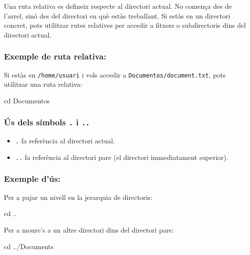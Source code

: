 \documentclass[
  12 pt,
  a4paper,
]{article}
\newenvironment{Shaded}{\begin{snugshade}}{\end{snugshade}}
\newcommand{\BuiltInTok}[1]{#1}
\newcommand{\NormalTok}[1]{#1}
\providecommand{\tightlist}{%
  \setlength{\itemsep}{0pt}\setlength{\parskip}{0pt}}
\begin{document}
Una ruta relativa es defineix respecte al directori actual. No comença
des de l'arrel, sinó des del directori en què estàs treballant. Si estàs
en un directori concret, pots utilitzar rutes relatives per accedir a
fitxers o subdirectoris dins del directori actual.

\subsubsection{Exemple de ruta
relativa:}\label{exemple-de-ruta-relativa}

Si estàs en \texttt{/home/usuari} i vols accedir a
\texttt{Documentos/document.txt}, pots utilitzar una ruta relativa:

\begin{Shaded}
\begin{Highlighting}[]
\BuiltInTok{cd}\NormalTok{ Documentos}
\end{Highlighting}
\end{Shaded}

\subsubsection{\texorpdfstring{Ús dels símbols \texttt{.} i
\texttt{..}}{Ús dels símbols . i ..}}\label{uxfas-dels-suxedmbols-.-i-..}

\begin{itemize}
\tightlist
\item
  \texttt{.} fa referència al directori actual.
\item
  \texttt{..} fa referència al directori pare (el directori
  immediatament superior).
\end{itemize}

\subsubsection{Exemple d'ús:}\label{exemple-duxfas-1}

Per a pujar un nivell en la jerarquia de directoris:

\begin{Shaded}
\begin{Highlighting}[]
\BuiltInTok{cd}\NormalTok{ ..}
\end{Highlighting}
\end{Shaded}

Per a moure's a un altre directori dins del directori pare:

\begin{Shaded}
\begin{Highlighting}[]
\BuiltInTok{cd}\NormalTok{ ../Documents}
\end{Highlighting}
\end{Shaded}
\end{document}
